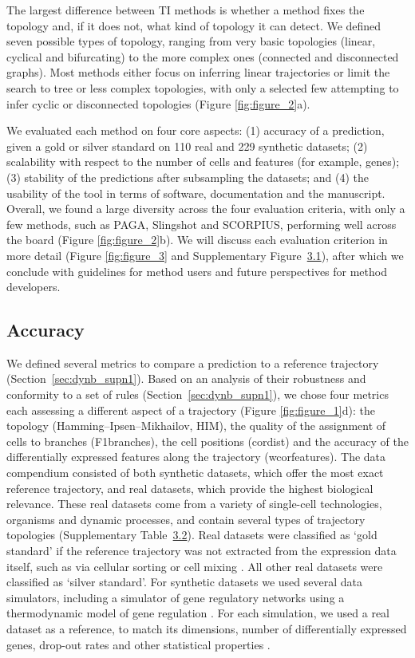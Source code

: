 The largest difference between TI methods is whether a method fixes the topology and, if it does not, what kind of topology it can detect. We defined seven possible types of topology, ranging from very basic topologies (linear, cyclical and bifurcating) to the more complex ones (connected and disconnected graphs). Most methods either focus on inferring linear trajectories or limit the search to tree or less complex topologies, with only a selected few attempting to infer cyclic or disconnected topologies (Figure \ref{fig:figure_2}a).

We evaluated each method on four core aspects: (1) accuracy of a prediction, given a gold or silver standard on 110 real and 229 synthetic datasets; (2) scalability with respect to the number of cells and features (for example, genes); (3) stability of the predictions after subsampling the datasets; and (4) the usability of the tool in terms of software, documentation and the manuscript. Overall, we found a large diversity across the four evaluation criteria, with only a few methods, such as PAGA, Slingshot and SCORPIUS, performing well across the board (Figure \ref{fig:figure_2}b). We will discuss each evaluation criterion in more detail (Figure \ref{fig:figure_3} and Supplementary Figure~\hyperref[fig:suppfig_2]{3.1}), after which we conclude with guidelines for method users and future perspectives for method developers.


\subsection{Accuracy}

We defined several metrics to compare a prediction to a reference trajectory (Section~\ref{sec:dynb_supn1}). Based on an analysis of their robustness and conformity to a set of rules (Section~\ref{sec:dynb_supn1}), we chose four metrics each assessing a different aspect of a trajectory (Figure \ref{fig:figure_1}d): the topology (Hamming–Ipsen–Mikhailov, HIM), the quality of the assignment of cells to branches (F1branches), the cell positions (cordist) and the accuracy of the differentially expressed features along the trajectory (wcorfeatures). The data compendium consisted of both synthetic datasets, which offer the most exact reference trajectory, and real datasets, which provide the highest biological relevance. These real datasets come from a variety of single-cell technologies, organisms and dynamic processes, and contain several types of trajectory topologies (Supplementary Table~\hyperref[tab:supptable_2]{3.2}). Real datasets were classified as ‘gold standard’ if the reference trajectory was not extracted from the expression data itself, such as via cellular sorting or cell mixing \cite{tian_scrnaseqmixologybetter_2018}. All other real datasets were classified as ‘silver standard’. For synthetic datasets we used several data simulators, including a simulator of gene regulatory networks using a thermodynamic model of gene regulation \cite{schaffter_genenetweaversilicobenchmark_2011}. For each simulation, we used a real dataset as a reference, to match its dimensions, number of differentially expressed genes, drop-out rates and other statistical properties \cite{zappia_splattersimulationsinglecell_2017}.

